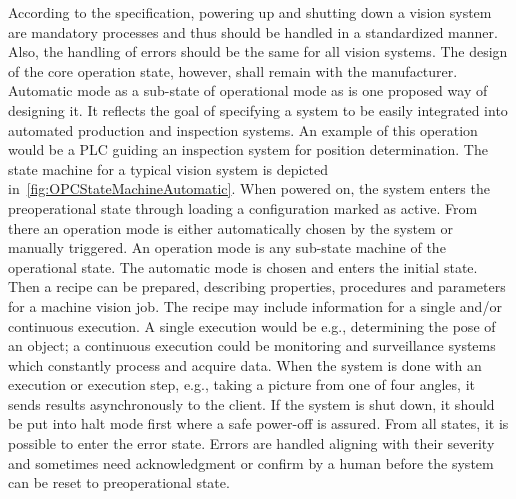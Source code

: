 According to the specification, powering up and shutting down a vision system are mandatory processes and thus should be handled in a standardized manner. Also, the handling of errors should be the same for all vision systems. The design of the core operation state, however, shall remain with the manufacturer. Automatic mode as a sub-state of operational mode as is one proposed way of designing it. It reflects the goal of specifying a system to be easily integrated into automated production and inspection systems. An example of this operation would be a PLC guiding an inspection system for position determination. The state machine for a typical vision system is depicted in~\ref{fig:OPCStateMachineAutomatic}. When powered on, the system enters the preoperational state through loading a configuration marked as active. From there an operation mode is either automatically chosen by the system or manually triggered. An operation mode is any sub-state machine of the operational state. The automatic mode is chosen and enters the initial state. Then a recipe can be prepared, describing properties, procedures and parameters for a machine vision job. The recipe may include information for a single and/or continuous execution. A single execution would be e.g., determining the pose of an object; a continuous execution could be monitoring and surveillance systems which constantly process and acquire data. When the system is done with an execution or execution step, e.g., taking a picture from one of four angles, it sends results asynchronously to the client. If the system is shut down, it should be put into halt mode first where a safe power-off is assured. From all states, it is possible to enter the error state. Errors are handled aligning with their severity and sometimes need acknowledgment or confirm by a human before the system can be reset to preoperational state.

